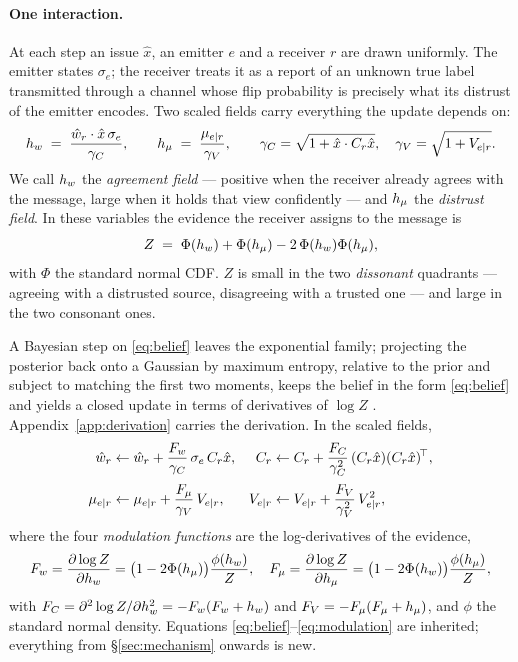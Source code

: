 \paragraph{One interaction.}
At each step an issue $\hat{x}$, an emitter $e$ and a receiver $r$ are drawn
uniformly. The emitter states $\sigma_e$; the receiver treats it as a report of
an unknown true label transmitted through a channel whose flip probability is
precisely what its distrust of the emitter encodes. Two scaled fields carry
everything the update depends on:
%
\begin{equation}
  h_{w} \;=\; \frac{\hat{w}_r\cdot\hat{x}\,\sigma_e}{\gamma_C},
  \qquad
  h_{\mu} \;=\; \frac{\mu_{e|r}}{\gamma_V},
  \qquad
  \gamma_C=\sqrt{1+\hat{x}\cdot C_r\hat{x}},\quad \gamma_V=\sqrt{1+V_{e|r}} .
  \label{eq:fields}
\end{equation}
%
We call $h_{w}$ the \emph{agreement field} --- positive when the receiver already
agrees with the message, large when it holds that view confidently --- and
$h_{\mu}$ the \emph{distrust field}. In these variables the evidence the receiver
assigns to the message is
%
\begin{equation}
  Z \;=\; \Phi(h_{w}) + \Phi(h_{\mu}) - 2\,\Phi(h_{w})\Phi(h_{\mu}),
  \label{eq:evidence}
\end{equation}
%
with $\Phi$ the standard normal CDF. $Z$ is small in the two \emph{dissonant}
quadrants --- agreeing with a distrusted source, disagreeing with a trusted one
--- and large in the two consonant ones.

A Bayesian step on \eqref{eq:belief} leaves the exponential family; projecting
the posterior back onto a Gaussian by maximum entropy, relative to the prior and
subject to matching the first two moments, keeps the belief in the form
\eqref{eq:belief} and yields a closed update in terms of derivatives of $\log Z$
\citep{opper1996online,opper1998bayesian,solla1999optimal,caticha2020entropic}.
Appendix~\ref{app:derivation} carries the derivation. In the scaled fields,
%
\begin{align}
  \hat{w}_r &\leftarrow \hat{w}_r + \frac{F_{w}}{\gamma_C}\,\sigma_e\,C_r\hat{x},
  &
  C_r &\leftarrow C_r + \frac{F_{C}}{\gamma_C^{2}}\,(C_r\hat{x})(C_r\hat{x})^{\!\top},
  \label{eq:update-ideo}\\[2pt]
  \mu_{e|r} &\leftarrow \mu_{e|r} + \frac{F_{\mu}}{\gamma_V}\,V_{e|r},
  &
  V_{e|r} &\leftarrow V_{e|r} + \frac{F_{V}}{\gamma_V^{2}}\,V_{e|r}^{2},
  \label{eq:update-aff}
\end{align}
%
where the four \emph{modulation functions} are the log-derivatives of the
evidence,
%
\begin{equation}
  F_{w} = \frac{\partial \log Z}{\partial h_{w}} = \bigl(1-2\Phi(h_{\mu})\bigr)\frac{\phi(h_{w})}{Z},
  \quad
  F_{\mu} = \frac{\partial \log Z}{\partial h_{\mu}} = \bigl(1-2\Phi(h_{w})\bigr)\frac{\phi(h_{\mu})}{Z},
  \label{eq:modulation}
\end{equation}
%
with $F_{C}=\partial^2\log Z/\partial h_{w}^2=-F_{w}(F_{w}+h_{w})$ and
$F_{V}=-F_{\mu}(F_{\mu}+h_{\mu})$, and $\phi$ the standard normal density. Equations
\eqref{eq:belief}--\eqref{eq:modulation} are inherited; everything from
\S\ref{sec:mechanism} onwards is new.

